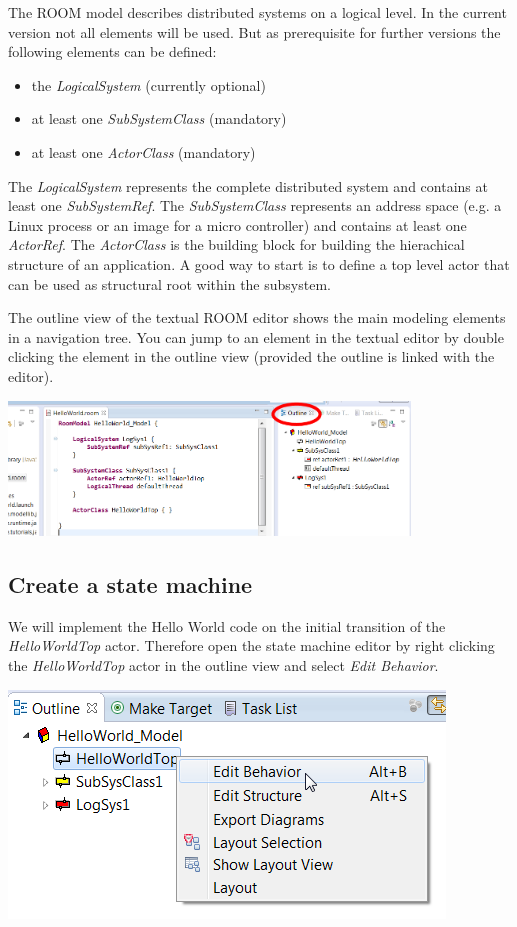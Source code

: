 The ROOM model describes distributed systems on a logical level. In the current version not all 
elements will be used. But as prerequisite for further versions the following elements can be defined:
\begin{itemize}
\item the \textit{LogicalSystem} (currently optional)
\item at least one \textit{SubSystemClass} (mandatory)
\item at least one \textit{ActorClass} (mandatory)
\end{itemize}

The \textit{LogicalSystem} represents the complete distributed system and contains at least one 
\textit{SubSystemRef}. The \textit{SubSystemClass} represents an address space (e.g. a Linux process or an image for a micro controller) and contains at least one 
\textit{ActorRef}. The \textit{ActorClass} is the building block for building the hierachical structure of an application. 
A good way to start is to define a top level actor that can be used as structural root within the subsystem.

The outline view of the textual ROOM editor shows the main modeling elements in a navigation tree.
You can jump to an element in the textual editor by double clicking the element in the outline view
(provided the outline is linked with the editor).

\includegraphics[width=0.8\textwidth]{images/015-HelloWorld02.png}

\subsection{Create a state machine}

We will implement the Hello World code on the initial transition of the \textit{HelloWorldTop} actor. 
Therefore open the state machine editor by right clicking the \textit{HelloWorldTop} actor in the outline view and select \textit{Edit Behavior}.

\includegraphics{images/015-HelloWorld03.png}

